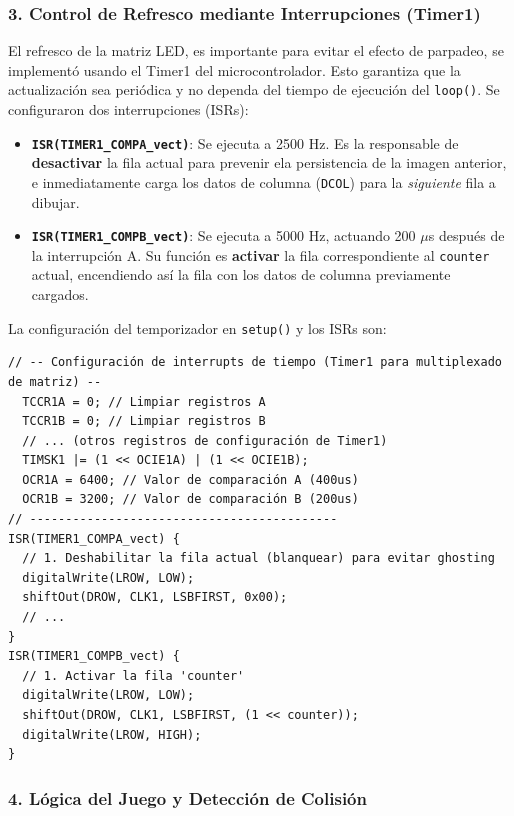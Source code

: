      

\subsubsection*{3. Control de Refresco mediante Interrupciones (Timer1)}

El refresco de la matriz LED, es importante para evitar el efecto de parpadeo, se implementó usando el Timer1 del microcontrolador. Esto garantiza que la actualización sea periódica y no dependa del tiempo de ejecución del \texttt{loop()}. Se configuraron dos interrupciones (ISRs):

\begin{itemize}
    \item \textbf{\texttt{ISR(TIMER1\_COMPA\_vect)}}: Se ejecuta a 2500 Hz. Es la responsable de \textbf{desactivar} la fila actual para prevenir ela persistencia de la imagen anterior, e inmediatamente carga los datos de columna (\texttt{DCOL}) para la \textit{siguiente} fila a dibujar.

    \item \textbf{\texttt{ISR(TIMER1\_COMPB\_vect)}}: Se ejecuta a 5000 Hz, actuando 200 $\mu$s después de la interrupción A. Su función es \textbf{activar} la fila correspondiente al \texttt{counter} actual, encendiendo así la fila con los datos de columna previamente cargados.
\end{itemize}


La configuración del temporizador en \texttt{setup()} y los ISRs son:


    \begin{verbatim}
// -- Configuración de interrupts de tiempo (Timer1 para multiplexado de matriz) --
  TCCR1A = 0; // Limpiar registros A
  TCCR1B = 0; // Limpiar registros B
  // ... (otros registros de configuración de Timer1)
  TIMSK1 |= (1 << OCIE1A) | (1 << OCIE1B);
  OCR1A = 6400; // Valor de comparación A (400us)
  OCR1B = 3200; // Valor de comparación B (200us)
// -------------------------------------------
ISR(TIMER1_COMPA_vect) {
  // 1. Deshabilitar la fila actual (blanquear) para evitar ghosting
  digitalWrite(LROW, LOW);
  shiftOut(DROW, CLK1, LSBFIRST, 0x00);
  // ...
}
ISR(TIMER1_COMPB_vect) {
  // 1. Activar la fila 'counter' 
  digitalWrite(LROW, LOW);
  shiftOut(DROW, CLK1, LSBFIRST, (1 << counter));
  digitalWrite(LROW, HIGH);
}
    \end{verbatim}


\subsubsection*{4. Lógica del Juego y Detección de Colisión}

